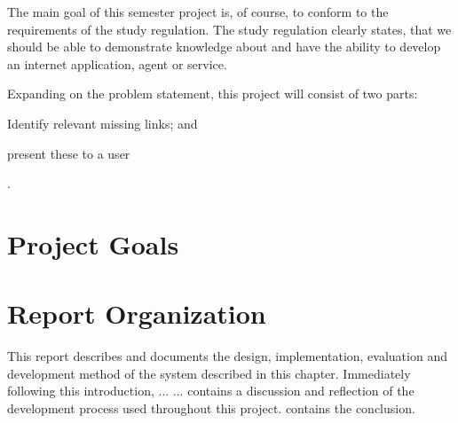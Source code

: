 The main goal of this semester project is, of course, to conform to the requirements of the study regulation. The study regulation clearly states, that we should be able to demonstrate knowledge about and have the ability to develop an internet application, agent or service.

Expanding on the problem statement, this project will consist of two parts:
\begin{enumerate*}[label=(\roman*)]
  \item Identify relevant missing links; and
  \item present these to a user
\end{enumerate*}.


\section{Project Goals}

\section{Report Organization}
This report describes and documents the design, implementation, evaluation and development method of the system described in this chapter. Immediately following this introduction,  ... \dummy ...  contains a discussion and reflection of the development process used throughout this project.  contains the conclusion.